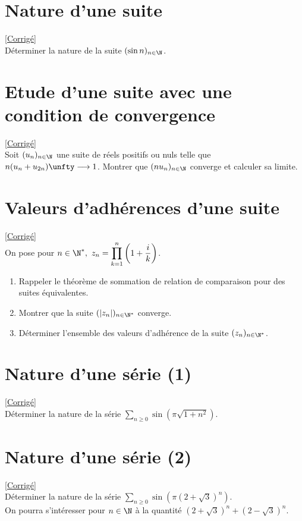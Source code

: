 \documentclass{book}
\begin{document}
	\section{Nature d'une suite }
	\textcolor{blue}{\hyperref[sec:nature-dune-suite]{[Corrigé]}}\\
	\label{Nature d'une suite}
	Déterminer la nature de la suite $(\sin n)_{n\in \N}$.
	
	\section{Etude d'une suite avec une condition de convergence}
	\textcolor{blue}{\hyperref[Etude d'une suite avec une condition de convergence corrigé]{[Corrigé]}}\\
	\label{Etude d'une suite avec une condition de convergence}
	Soit $(u_n)_{n\in \N}$ une suite de réels positifs ou nuls telle que $n(u_n+u_{2n})\unfty\longrightarrow 1$. Montrer que $(nu_n)_{n\in \N}$ converge et calculer sa limite.
	
	\section{Valeurs d'adhérences d'une suite }
	\label{Valeurs d'adhérences d'une suite}
	\textcolor{blue}{\hyperref[Valeurs d'adhérences d'une suite corrigé]{[Corrigé]}}\\
	On pose pour $n\in \N^*,\ z_n=\displaystyle\prod_{k=1}^n\left(1+\frac{i}{k}\right)$.
	\begin{enumerate}
		\item Rappeler le théorème de sommation de relation de comparaison pour des suites équivalentes.
		\item Montrer que la suite $(|z_n|)_{n\in \N^*}$ converge.
		\item Déterminer l'ensemble des valeurs d'adhérence de la suite $(z_n)_{n\in \N^*}$.
	\end{enumerate}
	
	\section{Nature d'une série (1) }
	\label{Nature d'une série (4)}
	\textcolor{blue}{\hyperref[Nature d'une série (4) corrigé]{[Corrigé]}}\\
	Déterminer la nature de la série $\displaystyle\sum\limits_{n\geq 0} \sin\left(\pi\sqrt{1+n^2}\right)$.
	
	\section{Nature d'une série (2) }
	\label{Nature d'une série (4)}
	\textcolor{blue}{\hyperref[Nature d'une série (4) corrigé]{[Corrigé]}}\\
	Déterminer la nature de la série $\displaystyle\sum\limits_{n\geq 0}\sin\left(\pi(2+\sqrt 3)^n\right)$.
	\\On pourra s'intéresser pour $n\in \N$ à la quantité $(2+\sqrt 3)^n+(2-\sqrt 3)^n$.
	
\end{document}

